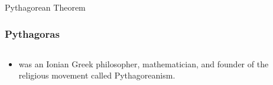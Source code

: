 \begin{omgroup}{Pythagorean Theorem}
\begin{module}[id=pythagoras]
\begin{frame}
  \frametitle{Pythagoras}
  \begin{columns}
    \begin{column}{5.8cm}
      \begin{itemize}
      \item
      \begin{definition}
         was an Ionian Greek philosopher, mathematician, and founder of the religious movement called Pythagoreanism.
      \end{definition}
    \end{itemize}
    \end{column}
    \begin{column}{5.5cm}
    \end{column}
  \end{columns}
\end{frame}
\end{module}
\end{omgroup}
